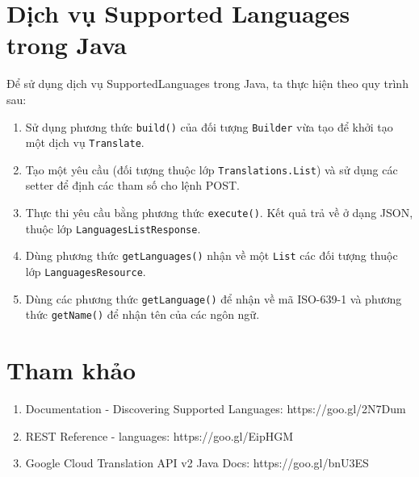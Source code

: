 \documentclass[../thesis.tex]{subfiles}
\begin{document}
\section{Dịch vụ Supported Languages trong Java}
Để sử dụng dịch vụ SupportedLanguages trong Java, ta thực hiện theo quy trình sau:
\begin{enumerate}
  \item Sử dụng phương thức \lstinline{build()} của đối tượng \lstinline{Builder} vừa tạo để khởi tạo một dịch vụ \lstinline{Translate}.
  \item Tạo một yêu cầu (đối tượng thuộc lớp \lstinline{Translations.List}) và sử dụng các setter để định các tham số cho lệnh POST.
  \item Thực thi yêu cầu bằng phương thức \lstinline{execute()}. Kết quả trả về ở dạng JSON, thuộc lớp \lstinline{LanguagesListResponse}.
  \item Dùng phương thức \lstinline{getLanguages()} nhận về một \lstinline{List} các đối tượng thuộc lớp \lstinline{LanguagesResource}.
  \item Dùng các phương thức \lstinline{getLanguage()} để nhận về mã ISO-639-1 và phương thức \lstinline{getName()} để nhận tên của các ngôn ngữ.
\end{enumerate}

\section*{Tham khảo}

\begin{enumerate}
  \item Documentation - Discovering Supported Languages: https://goo.gl/2N7Dum
  \item REST Reference - languages: https://goo.gl/EipHGM
  \item Google Cloud Translation API v2 Java Docs: https://goo.gl/bnU3ES
\end{enumerate}
\end{document}
